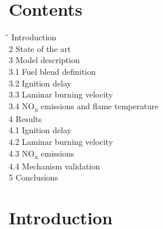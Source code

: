 \documentclass[11pt,a4paper]{article}
\begin{document}
\vspace{1cm}
\section*{Contents}
\begin{tabbing}
\hspace{0.6cm}\=\hspace{9.5cm}\= \> Introduction  \\[2pt]
2 \> State of the art  \\[2pt]
3 \> Model description  \\[2pt]
\> \hspace{0.4cm} 3.1 \quad Fuel blend definition  \\[2pt]
\> \hspace{0.4cm} 3.2 \quad Ignition delay  \\[2pt]
\> \hspace{0.4cm} 3.3 \quad Laminar burning velocity  \\[2pt]
\> \hspace{0.4cm} 3.4 \quad NO\textsubscript{x} emissions and flame temperature  \\[2pt]
4 \> Results  \\[2pt]
\> \hspace{0.4cm} 4.1 \quad Ignition delay  \\[2pt]
\> \hspace{0.4cm} 4.2 \quad Laminar burning velocity  \\[2pt]
\> \hspace{0.4cm} 4.3 \quad NO\textsubscript{x} emissions  \\[2pt]
\> \hspace{0.4cm} 4.4 \quad Mechanism validation  \\[2pt]
5 \> Conclusions  \\[2pt]
\end{tabbing}
\clearpage

\section{Introduction}
\end{document}
